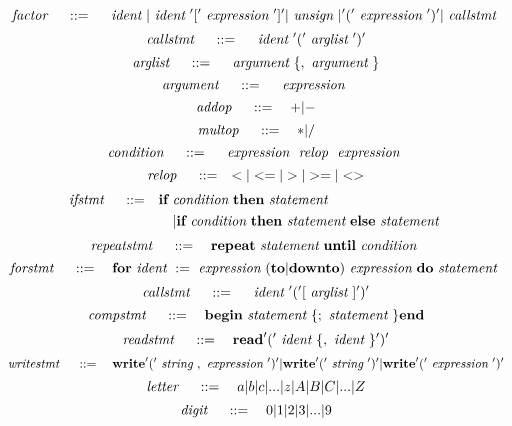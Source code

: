 \[
	~\emph{factor}~ \quad ::= \quad
		~\emph{ident}~ | ~\emph{ident}~ '[' ~\emph{expression}~ ']' | ~\emph{unsign}~ |
			'(' ~\emph{expression}~ ')' | ~\emph{callstmt}~
\]
\[
	~\emph{callstmt}~ \quad ::= \quad
		~\emph{ident}~ '(' ~\emph{arglist}~ ')'
\]
\[
	~\emph{arglist}~ \quad ::= \quad
		~\emph{argument}~ \{, ~\emph{argument}~ \}
\]
\[
	~\emph{argument}~ \quad ::= \quad
		~\emph{expression}~
\]
\[
	~\emph{addop}~ \quad ::= \quad
		+|-
\]
\[
	~\emph{multop}~ \quad ::= \quad
		*|/
\]
\[
	~\emph{condition}~ \quad ::= \quad
		~\emph{expression}~ ~\emph{relop}~ ~\emph{expression}~
\]
\[
	~\emph{relop}~ \quad ::= \quad
		< | <= | > | >= |  <>
\]
\[
\begin{aligned}
	~\emph{ifstmt}~ \quad ::= \quad
		& \textbf{if} ~\emph{condition}~ \textbf{then} ~\emph{statement}~ \\
		& \quad | \textbf{if} ~\emph{condition}~ \textbf{then} ~\emph{statement}~ \textbf{else} ~\emph{statement}~
\end{aligned}
\]
\[
	~\emph{repeatstmt}~ \quad ::= \quad
		\textbf{repeat} ~\emph{statement}~ \textbf{until} ~\emph{condition}~
\]
\[
	~\emph{forstmt}~ \quad ::= \quad
		\textbf{for} ~\emph{ident}~ := ~\emph{expression}~ ( \textbf{to} | \textbf{downto})
			~\emph{expression}~ \textbf{do} ~\emph{statement}~
\]
\[
	~\emph{callstmt}~ \quad ::= \quad
		~\emph{ident}~ '(' [ ~\emph{arglist}~] ')'
\]
\[
	~\emph{compstmt}~ \quad ::= \quad
		\textbf{begin} ~\emph{statement}~ \{; ~\emph{statement}~ \} \textbf{end}
\]
\[
	~\emph{readstmt}~ \quad ::= \quad
		\textbf{read} '(' ~\emph{ident}~ \{, ~\emph{ident}~ \} ')'
\]
\[
	~\emph{writestmt}~ \quad ::= \quad
		\textbf{write} '(' ~\emph{string}~ , ~\emph{expression}~ ')' |
			\textbf{write} '(' ~\emph{string}~ ')' |
				\textbf{write} '(' ~\emph{expression}~')'
\]
\[
	~\emph{letter}~ \quad ::= \quad
		a|b|c|...|z|A|B|C|...|Z
\]
\[
	~\emph{digit}~ \quad ::= \quad
		0|1|2|3|...|9
\]
